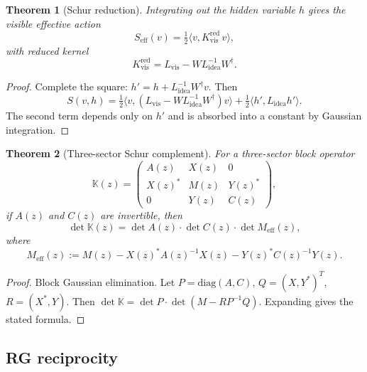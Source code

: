 \documentclass[12pt]{article}
\theoremstyle{plain}
\newtheorem{theorem}{Theorem}[section]
\theoremstyle{definition}
\numberwithin{equation}{section}
\newcommand{\red}{\mathrm{red}}
\newcommand{\vis}{\mathrm{vis}}
\newcommand{\idea}{\mathrm{idea}}
\begin{document}
\begin{theorem}[Schur reduction]\label{thm:schur}
Integrating out the hidden variable $h$ gives the visible effective action
\begin{equation}
S_{\mathrm{eff}}(v) = \tfrac{1}{2}\langle v, K_{\vis}^{\red}\, v\rangle,
\end{equation}
with reduced kernel
\begin{equation}
\boxed{K_{\vis}^{\red} = L_{\vis} - W L_{\idea}^{-1} W^\dagger.}
\end{equation}
\end{theorem}

\begin{proof}
Complete the square: $h'=h+L_{\idea}^{-1}W^\dagger v$.  Then
\begin{equation}
S(v,h) = \tfrac{1}{2}\langle v,(L_{\vis}-WL_{\idea}^{-1}W^\dagger)v\rangle + \tfrac{1}{2}\langle h',L_{\idea} h'\rangle.
\end{equation}
The second term depends only on $h'$ and is absorbed into a constant by Gaussian integration.
\end{proof}

\begin{theorem}[Three-sector Schur complement]\label{thm:threesectorschur}
For a three-sector block operator
\begin{equation}
\mathbb{K}(z) = \begin{pmatrix}
A(z) & X(z) & 0 \\
X(z)^* & M(z) & Y(z)^* \\
0 & Y(z) & C(z)
\end{pmatrix},
\end{equation}
if $A(z)$ and $C(z)$ are invertible, then
\begin{equation}
\det\mathbb{K}(z) = \det A(z)\cdot\det C(z)\cdot\det M_{\mathrm{eff}}(z),
\end{equation}
where
\begin{equation}
M_{\mathrm{eff}}(z) := M(z) - X(z)^*A(z)^{-1}X(z) - Y(z)^*C(z)^{-1}Y(z).
\end{equation}
\end{theorem}

\begin{proof}
Block Gaussian elimination.  Let $P=\mathrm{diag}(A,C)$, $Q=(X,Y^*)^T$, $R=(X^*,Y)$.  Then $\det\mathbb{K}=\det P\cdot\det(M-RP^{-1}Q)$.  Expanding gives the stated formula.
\end{proof}

\subsection{RG reciprocity}
\end{document}
